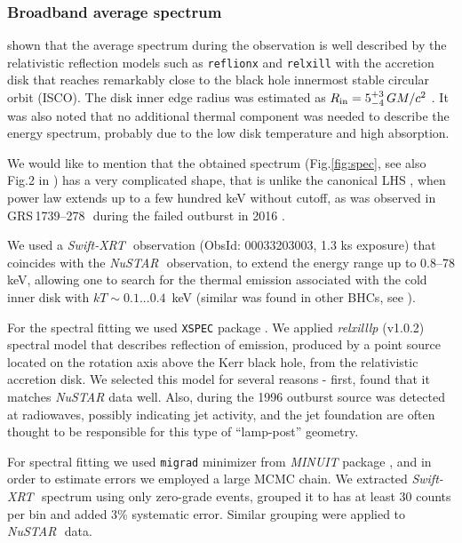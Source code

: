 \documentclass[a4paper,fleqn,usenatbib]{mnras}
\def\grs{{GRS\,1739--278\,}}
\def\swiftx{{\em Swift-XRT\,}}
\def\nustar{{\em NuSTAR\,}}
\begin{document}
\subsubsection{Broadband average spectrum}
\label{sec:spec}            

\citet{miller15_nust} shown that the average spectrum during the observation is well described by the relativistic reflection models such as \texttt{reflionx} \citep{ross05} and \texttt{relxill} \citep{garcia14, dauser14,dauser16} with the accretion disk that reaches remarkably close to the black hole innermost stable circular orbit (ISCO). 
The disk inner edge radius was estimated as $R_{\rm in} = 5^{+3}_{-4}\, G M/c^{2}$ \citep{miller15_nust}. 
It was also noted that no additional thermal component was needed to describe the energy spectrum, probably due to the low disk temperature and high absorption.

We would like to mention that the obtained spectrum (Fig.\ref{fig:spec}, see also Fig.2 in \citet{miller15_nust}) has a very complicated shape, that is unlike the canonical LHS \citep{zdziarski04}, when power law extends up to a few hundred keV without cutoff, as was observed in \grs\, during the failed outburst in 2016 \citep{mereminskiy17grs}.

We used a \swiftx\, observation (ObsId: 00033203003, 1.3 ks exposure) that coincides with the \nustar\, observation, to extend the energy range up to 0.8--78 keV, allowing one to search for the thermal emission associated with the cold inner disk with $kT \sim 0.1...0.4$~keV (similar was found in other BHCs, see \cite[][ etc]{miller06b,miller06a,parker15}).

For the spectral fitting we used \texttt{XSPEC} package \citep{arnaud96}.
We applied {\it relxilllp} (v1.0.2) spectral model that describes reflection of emission, produced by a point source located on the rotation axis above the Kerr black hole, from the relativistic accretion disk. 
We selected this model for several reasons - first, \cite{miller15_nust} found that it matches {\it NuSTAR} data well. 
Also, during the 1996 outburst source was detected at radiowaves, possibly indicating jet activity, and the jet foundation are often thought to be responsible for this type of ``lamp-post'' geometry. 

For spectral fitting we used \texttt{migrad} minimizer from {\em MINUIT} package \citep{james75minuit}, and in order to estimate errors we employed a large MCMC chain. 
We extracted \swiftx\, spectrum using only zero-grade events, grouped it to has at least 30 counts per bin and added 3\% systematic error. Similar grouping were applied to \nustar\, data. 
\end{document}
